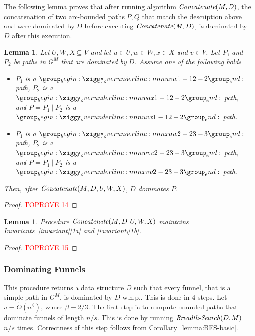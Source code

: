 \documentclass[11pt]{article}
\newtheorem{lemma}[theorem]{Lemma}
\newcommand{\Concat}{\mbox{{\it Concatenate}}}
\newcommand{\BFS}{\mbox{{\it Breadth}-{\it Search}}}
\begin{document}
The following lemma proves that after running algorithm $\Concat(M,D)$,
the concatenation of two arc-bounded paths $P,Q$ that match the description above and were dominated by $D$ before
executing $\Concat(M,D)$, is dominated by $D$ after this execution.


\begin{lemma}\label{lemma:concat-basic}
    Let $U,W,X \subseteq V$ and let $u\in U,w\in W,x\in X$ and $v\in V$. Let $P_1$ and $P_2$ be paths in $G^M$ that are dominated by $D$. Assume one of the following holds
    \begin{itemize}
        \item $P_1$ is a $\overunderline{uvw}{1-1}{2-2}$ path, $P_2$ is a $\overunderline{wax}{1-1}{2-2}$ path, and $P=P_1 \mid P_2$ is a $\overunderline{uvx}{1-1}{2-2}$ path.
        \item $P_1$ is a $\overunderline{xaw}{2-2}{3-3}$ path, $P_2$ is a $\overunderline{wvu}{2-2}{3-3}$ path, and $P=P_1 \mid P_2$ is a $\overunderline{xvu}{2-2}{3-3}$ path.
    \end{itemize}
    Then, after $\Concat(M,D,U,W,X)$, $D$ dominates $P$.
\end{lemma}

\begin{proof}\textcolor{red}{TOPROVE 14}\end{proof}


\begin{lemma}\label{lemma:concat-maintains-invariant}
    Procedure $\Concat(M,D,U,W,X)$ maintains Invariants~\ref{invariant}\ref{1a} and \ref{invariant}\ref{1b}.
\end{lemma}

\begin{proof}\textcolor{red}{TOPROVE 15}\end{proof}

\subsubsection{Dominating Funnels}\label{sec:funnels}
This procedure returns a data structure $D$ such that every funnel, that is a simple path
in $G^M$, is dominated by $D$ w.h.p.. This is done in $4$ steps. Let $s = \tilde{O}(n^\beta)$, where $\beta=2/3$. The first step is to compute bounded paths that dominate funnels of length $n/s$. This is done by running $\BFS(D,M)$  $n/s$ times. Correctness of this step follows from Corollary~\ref{lemma:BFS-basic}.
\end{document}
